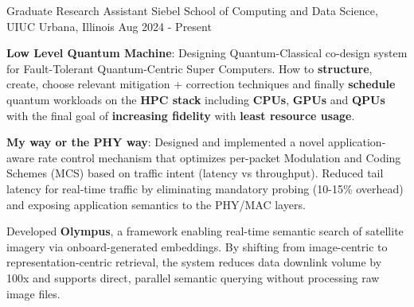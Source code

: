

\begin{cventries}


  \cventry
    {Graduate Research Assistant} %
    {Siebel School of Computing and Data Science, UIUC} %
    {Urbana, Illinois} %
    {Aug 2024 - Present} %
    {
      \begin{cvitems} %
      \item \textbf{Low Level Quantum Machine}: Designing Quantum-Classical co-design system for Fault-Tolerant Quantum-Centric Super Computers. How to \textbf{structure}, create, choose relevant mitigation + correction techniques and finally \textbf{schedule} quantum workloads on the \textbf{HPC stack} including \textbf{CPUs}, \textbf{GPUs} and \textbf{QPUs} with the final goal of \textbf{increasing fidelity} with \textbf{least resource usage}.
      \item \textbf{My way or the PHY way}: Designed and implemented a novel application-aware rate control mechanism that optimizes per-packet Modulation and Coding Schemes (MCS) based on traffic intent (latency vs throughput). Reduced tail latency for real-time traffic by eliminating mandatory probing (10-15\% overhead) and exposing application semantics to the PHY/MAC layers.
      \item Developed \textbf{Olympus}, a framework enabling real-time semantic search of satellite imagery via onboard-generated embeddings. By shifting from image-centric to representation-centric retrieval, the system reduces data downlink volume by 100x and supports direct, parallel semantic querying without processing raw image files.
      \end{cvitems}
    }


\end{cventries}
